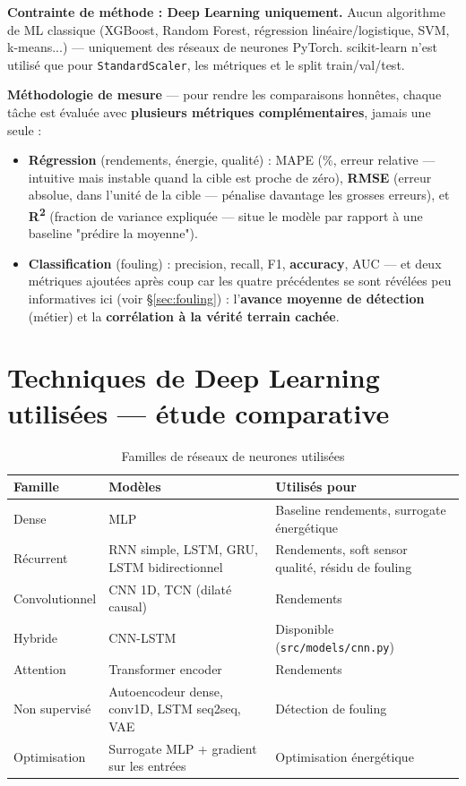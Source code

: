 \documentclass[11pt]{article}
\begin{document}
\textbf{Contrainte de méthode : Deep Learning uniquement.} Aucun algorithme de ML classique
(XGBoost, Random Forest, régression linéaire/logistique, SVM, k-means...) — uniquement des
réseaux de neurones PyTorch. scikit-learn n'est utilisé que pour \texttt{StandardScaler}, les
métriques et le split train/val/test.

\textbf{Méthodologie de mesure} — pour rendre les comparaisons honnêtes, chaque tâche est
évaluée avec \textbf{plusieurs métriques complémentaires}, jamais une seule :
\begin{itemize}
  \item \textbf{Régression} (rendements, énergie, qualité) : MAPE (\%, erreur relative —
  intuitive mais instable quand la cible est proche de zéro), \textbf{RMSE} (erreur absolue,
  dans l'unité de la cible — pénalise davantage les grosses erreurs), et \textbf{R\textsuperscript{2}}
  (fraction de variance expliquée — situe le modèle par rapport à une baseline "prédire la
  moyenne").
  \item \textbf{Classification} (fouling) : precision, recall, F1, \textbf{accuracy}, AUC — et
  deux métriques ajoutées après coup car les quatre précédentes se sont révélées peu
  informatives ici (voir §\ref{sec:fouling}) : l'\textbf{avance moyenne de détection} (métier)
  et la \textbf{corrélation à la vérité terrain cachée}.
\end{itemize}

\section{Techniques de Deep Learning utilisées — étude comparative}

\begin{table}[h]
\centering
\begin{tabular}{p{3cm}p{6cm}p{5cm}}
\toprule
Famille & Modèles & Utilisés pour \\
\midrule
Dense & MLP & Baseline rendements, surrogate énergétique \\
Récurrent & RNN simple, LSTM, GRU, LSTM bidirectionnel & Rendements, soft sensor qualité, résidu de fouling \\
Convolutionnel & CNN 1D, TCN (dilaté causal) & Rendements \\
Hybride & CNN-LSTM & Disponible (\texttt{src/models/cnn.py}) \\
Attention & Transformer encoder & Rendements \\
Non supervisé & Autoencodeur dense, conv1D, LSTM seq2seq, VAE & Détection de fouling \\
Optimisation & Surrogate MLP + gradient sur les entrées & Optimisation énergétique \\
\bottomrule
\end{tabular}
\caption{Familles de réseaux de neurones utilisées}
\end{table}
\end{document}
